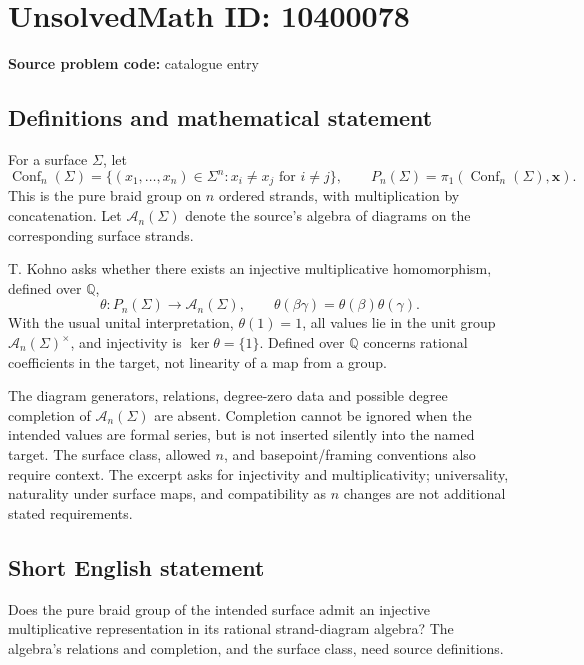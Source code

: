 \documentclass[11pt]{article}
\newcommand{\Q}{\mathbb{Q}}
\begin{document}
\section*{UnsolvedMath ID: 10400078}
\textbf{Source problem code:} catalogue entry
\subsection{Definitions and mathematical statement}
For a surface \(\Sigma\), let
\[
 \operatorname{Conf}_n(\Sigma)=\{(x_1,\ldots,x_n)\in\Sigma^n:x_i\ne x_j\text{ for }i\ne j\},
 \qquad P_n(\Sigma)=\pi_1(\operatorname{Conf}_n(\Sigma),\mathbf x).
\]
This is the pure braid group on \(n\) ordered strands, with multiplication by concatenation. Let \(\mathcal A_n(\Sigma)\) denote the source's algebra of diagrams on the corresponding surface strands.

T. Kohno asks whether there exists an injective multiplicative homomorphism, defined over \(\Q\),
\[
 \theta:P_n(\Sigma)\longrightarrow\mathcal A_n(\Sigma),\qquad
 \theta(\beta\gamma)=\theta(\beta)\theta(\gamma).
\]
With the usual unital interpretation, \(\theta(1)=1\), all values lie in the unit group \(\mathcal A_n(\Sigma)^\times\), and injectivity is \(\ker\theta=\{1\}\). Defined over \(\Q\) concerns rational coefficients in the target, not linearity of a map from a group.

The diagram generators, relations, degree-zero data and possible degree completion of \(\mathcal A_n(\Sigma)\) are absent. Completion cannot be ignored when the intended values are formal series, but is not inserted silently into the named target. The surface class, allowed \(n\), and basepoint/framing conventions also require context. The excerpt asks for injectivity and multiplicativity; universality, naturality under surface maps, and compatibility as \(n\) changes are not additional stated requirements.
\subsection{Short English statement}
Does the pure braid group of the intended surface admit an injective multiplicative representation in its rational strand-diagram algebra? The algebra's relations and completion, and the surface class, need source definitions.
\end{document}

